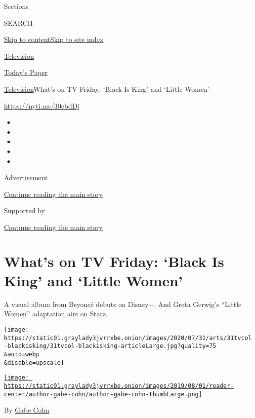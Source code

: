 Sections

SEARCH

\protect\hyperlink{site-content}{Skip to
content}\protect\hyperlink{site-index}{Skip to site index}

\href{https://www.nytimes3xbfgragh.onion/section/arts/television}{Television}

\href{https://myaccount.nytimes3xbfgragh.onion/auth/login?response_type=cookie\&client_id=vi}{}

\href{https://www.nytimes3xbfgragh.onion/section/todayspaper}{Today's
Paper}

\href{/section/arts/television}{Television}\textbar{}What's on TV
Friday: `Black Is King' and `Little Women'

\url{https://nyti.ms/30ebdDj}

\begin{itemize}
\item
\item
\item
\item
\item
\end{itemize}

Advertisement

\protect\hyperlink{after-top}{Continue reading the main story}

Supported by

\protect\hyperlink{after-sponsor}{Continue reading the main story}

\hypertarget{whats-on-tv-friday-black-is-king-and-little-women}{%
\section{What's on TV Friday: `Black Is King' and `Little
Women'}\label{whats-on-tv-friday-black-is-king-and-little-women}}

A visual album from Beyoncé debuts on Disney+. And Greta Gerwig's
``Little Women'' adaptation airs on Starz.

\texttt{[image: https://static01.graylady3jvrrxbe.onion/images/2020/07/31/arts/31tvcol-blackisking/31tvcol-blackisking-articleLarge.jpg?quality=75\\\&auto=webp\\\&disable=upscale]}

\href{https://www.nytimes3xbfgragh.onion/by/gabe-cohn}{\texttt{[image: https://static01.graylady3jvrrxbe.onion/images/2019/08/01/reader-center/author-gabe-cohn/author-gabe-cohn-thumbLarge.png]}}

By \href{https://www.nytimes3xbfgragh.onion/by/gabe-cohn}{Gabe Cohn}

